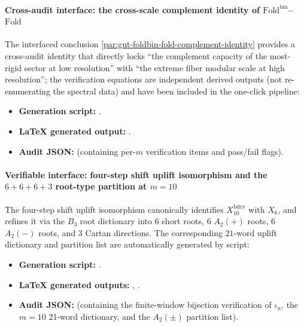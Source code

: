 \paragraph{Cross-audit interface: the cross-scale complement identity of \texorpdfstring{$\mathrm{Fold}^{\mathrm{bin}}$}{Foldbin}--\texorpdfstring{$\mathrm{Fold}$}{Fold}}
The interfaced conclusion \ref{par:gut-foldbin-fold-complement-identity} provides a cross-audit identity that directly locks ``the complement capacity of the most-rigid sector at low resolution'' with ``the extreme fiber modular scale at high resolution'';
the verification equations are independent derived outputs (not re-enumerating the spectral data) and have been included in the one-click pipeline:
\begin{itemize}
  \item \textbf{Generation script:} \texttt{}.
  \item \textbf{LaTeX generated output:} \texttt{}.
  \item \textbf{Audit JSON:} \texttt{} (containing per-\(m\) verification items and pass/fail flags).
\end{itemize}

\paragraph{Verifiable interface: four-step shift uplift isomorphism and the \(6+6+6+3\) root-type partition at \texorpdfstring{$m=10$}{m=10}}
The four-step shift uplift isomorphism canonically identifies \(X_{10}^{\mathrm{bdry}}\) with \(X_6\), and refines it via the \(B_3\) root dictionary into
\(6\) short roots, \(6\) \(A_2(+)\) roots, \(6\) \(A_2(-)\) roots, and \(3\) Cartan directions.
The corresponding \(21\)-word uplift dictionary and partition list are automatically generated by script:
\begin{itemize}
  \item \textbf{Generation script:} \texttt{}.
  \item \textbf{LaTeX generated outputs:} \texttt{},
  \texttt{}.
  \item \textbf{Audit JSON:} \texttt{} (containing the finite-window bijection verification of \(\iota_n\), the \(m=10\) 21-word dictionary, and the \(A_2(\pm)\) partition list).
\end{itemize}


